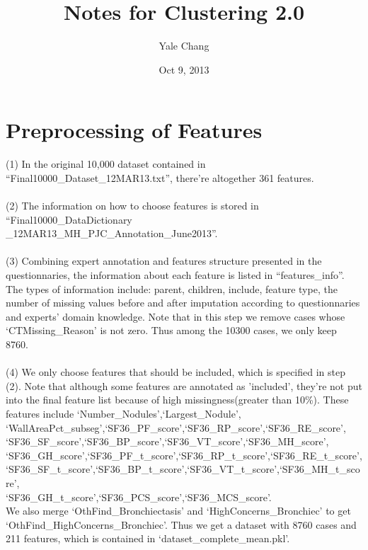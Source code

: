 \documentclass[11pt]{article}
\title{\textbf{Notes for Clustering 2.0}}
\author{Yale Chang}
\date{Oct 9, 2013}
\begin{document}
\maketitle

\section{Preprocessing of Features}
(1) In the original 10,000 dataset contained in ``Final10000\_Dataset\_12MAR13.txt'', there're altogether 361 features.\\
\\ 
(2) The information on how to choose features is stored in ``Final10000\_DataDictionary\\\_12MAR13\_MH\_PJC\_Annotation\_June2013''. \\ 
\\
(3) Combining expert annotation and features structure presented in the questionnaries, the information about each feature is listed in ``features\_info''. The types of information include: parent, children, include, feature type, the number of missing values before and after imputation according to questionnaries and experts' domain knowledge. Note that in this step we remove cases whose `CTMissing\_Reason' is not zero. Thus among the 10300 cases, we only keep 8760. \\
\\
(4) We only choose features that should be included, which is specified in step (2). Note that although some features are annotated as 'included', they're not put into the final feature list because of high missingness(greater than 10\%). These features include `Number\_Nodules',`Largest\_Nodule',\\
`WallAreaPct\_subseg',`SF36\_PF\_score',`SF36\_RP\_score',`SF36\_RE\_score',\\
`SF36\_SF\_score',`SF36\_BP\_score',`SF36\_VT\_score',`SF36\_MH\_score',\\
`SF36\_GH\_score',`SF36\_PF\_t\_score',`SF36\_RP\_t\_score',`SF36\_RE\_t\_score',\\
`SF36\_SF\_t\_score',`SF36\_BP\_t\_score',`SF36\_VT\_t\_score',`SF36\_MH\_t\_score',\\
`SF36\_GH\_t\_score',`SF36\_PCS\_score',`SF36\_MCS\_score'.\\
We also merge `OthFind\_Bronchiectasis' and `HighConcerns\_Bronchiec' to get `OthFind\_HighConcerns\_Bronchiec'. Thus we get a dataset with 8760 cases and 211 features, which is contained in `dataset\_complete\_mean.pkl'. \\
\end{document}
